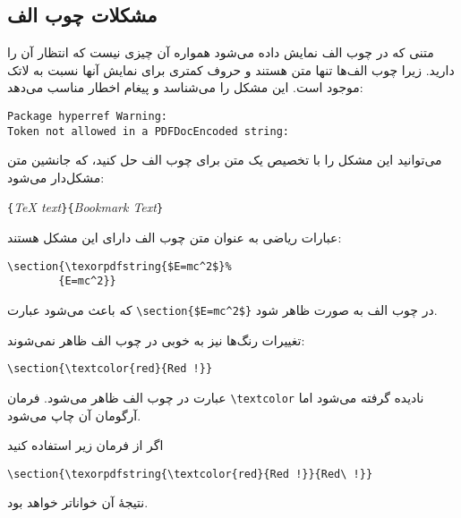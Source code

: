 {\subsection{مشکلات چوب الف}
متنی که در چوب الف نمایش داده می‌شود همواره آن چیزی نیست که انتظار آن را دارید. زیرا چوب الف‌ها تنها متن هستند و حروف کمتری برای نمایش آنها نسبت به لاتک موجود است.  این مشکل را می‌شناسد و پیغام اخطار مناسب می‌دهد:
\begin{code}
\setLR
\begin{verbatim}
Package hyperref Warning: 
Token not allowed in a PDFDocEncoded string:
\end{verbatim}
\setRL
\end{code}
می‌توانید این مشکل را با تخصیص یک متن برای چوب الف حل کنید، که جانشین متن مشکل‌دار می‌شود:

\begin{lscommand}
\verb|{|\emph{\TeX{} text}\verb|}{|\emph{Bookmark Text}\verb|}|
\end{lscommand}

عبارات ریاضی به عنوان متن چوب الف دارای این مشکل هستند:
\begin{code}
\begin{verbatim}
\section{\texorpdfstring{$E=mc^2$}%
        {E=mc^2}}
\end{verbatim}
\end{code}
که باعث می‌شود عبارت \verb+\section{$E=mc^2$}+ در چوب الف به صورت  ظاهر شود.

تغییرات رنگ‌ها نیز به خوبی در چوب الف ظاهر نمی‌شوند:
\begin{code}
\verb+\section{\textcolor{red}{Red !}}+
\end{code}
عبارت  در چوب الف ظاهر می‌شود. فرمان  \verb+\textcolor+ نادیده گرفته می‌شود اما آرگومان آن  چاپ می‌شود. 

اگر از فرمان زیر استفاده کنید
\begin{code}
\verb+\section{\texorpdfstring{\textcolor{red}{Red !}}{Red\ !}}+
\end{code}
نتیجهٔ آن خواناتر خواهد بود.

}
